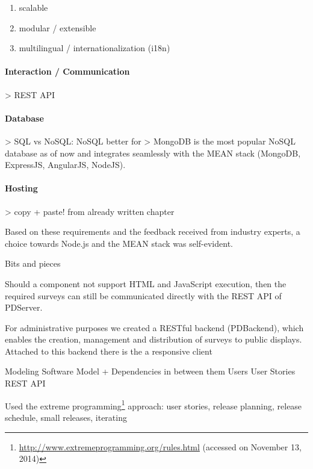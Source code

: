 			\begin{enumerate}[itemsep=0pt] 
			\item scalable
			\item modular / extensible
			\item multilingual / internationalization (i18n)
			\end{enumerate}


	\paragraph{Interaction / Communication}
	
		> REST API


	\paragraph{Database}
		> SQL vs NoSQL: NoSQL better for 
		> MongoDB is the most popular NoSQL database as of now and integrates seamlessly with the MEAN stack (MongoDB, ExpressJS, AngularJS, NodeJS).

	\paragraph{Hosting}
		 > copy + paste! from already written chapter




	Based on these requirements and the feedback received from industry experts, a choice towards Node.js and the MEAN stack was self-evident.



Bits and pieces

		Should a component not support HTML and JavaScript execution, then the required surveys can still be communicated directly with the REST API of PDServer.

		For administrative purposes we created a RESTful backend (PDBackend), which enables the creation, management and distribution of surveys to public displays. Attached to this backend there is the   a responsive client 









\clearpage

\label{sec:implementation:modeling}

Modeling
	Software Model
	+ Dependencies in between them
	Users
	User Stories
	REST API


Used the extreme programming\footnote{\url{http://www.extremeprogramming.org/rules.html} (accessed on November 13, 2014)} approach: user stories, release planning, release schedule, small releases, iterating




